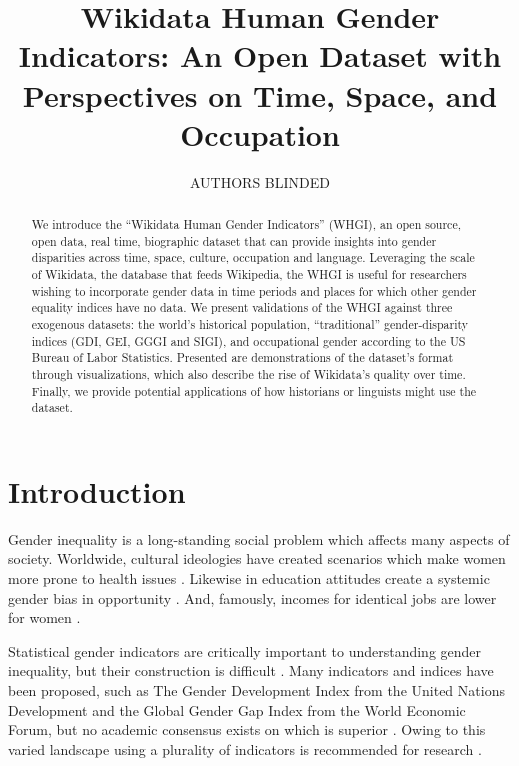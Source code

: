 \documentclass[letterpaper]{article}
\begin{document}
%
\title{Wikidata Human Gender Indicators: An Open Dataset with Perspectives on Time, Space, and Occupation}

\author{AUTHORS BLINDED}
    
\maketitle
\begin{abstract}
We introduce the ``Wikidata Human Gender Indicators'' (WHGI), an open source, open data, real time, biographic dataset that can provide insights into gender disparities across time, space, culture, occupation and language. Leveraging the scale of Wikidata, the database that feeds Wikipedia, the WHGI is useful for researchers wishing to incorporate gender data in time periods and places for which other gender equality indices have no data. We present validations of the WHGI against three exogenous datasets: the world's historical population, ``traditional'' gender-disparity indices (GDI, GEI, GGGI and SIGI), and occupational gender according to the US Bureau of Labor Statistics. Presented are demonstrations of the dataset's format through visualizations, which also describe the rise of Wikidata's quality over time. Finally, we provide potential applications of how historians or linguists might use the dataset.
\end{abstract}


\section{Introduction}

Gender inequality is a long-standing social problem which affects many aspects of society. Worldwide, cultural ideologies have created scenarios which make women more prone to health issues \cite{world_health_organization_women_2009}. Likewise in education attitudes create a systemic gender bias in opportunity \cite{heward_gender_1999}. And, famously, incomes for identical jobs are lower for women \cite{burstein_equal_????}.

Statistical gender indicators are critically important to understanding gender inequality, but their construction is difficult \cite{klasen_gender-related_2004}. Many indicators and indices have been proposed, such as The Gender Development Index from the United Nations Development and the Global Gender Gap Index from the World Economic Forum, but no academic consensus exists on which is superior \cite{hawken_cross-national_2012}. Owing to this varied landscape using a plurality of indicators is recommended for research \cite{jutting_measuring_2008}.
\end{document}
